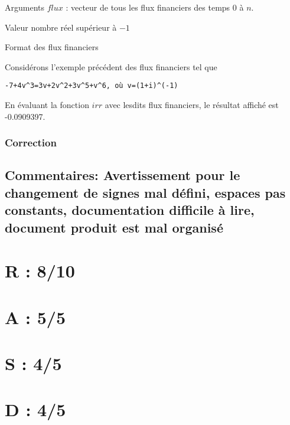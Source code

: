 \documentclass[]{article}
\begin{document}
Arguments \(flux\) : vecteur de tous les flux financiers des temps \(0\)
à \(n\).

Valeur nombre réel supérieur à \(-1\)

Format des flux financiers

Considérons l'exemple précédent des flux financiers tel que

\begin{verbatim}
-7+4v^3=3v+2v^2+3v^5+v^6, où v=(1+i)^(-1)
\end{verbatim}

En évaluant la fonction \(irr\) avec lesdits flux financiers, le
résultat affiché est -0.0909397.

\hypertarget{correction}{%
\subsubsection{Correction}\label{correction}}

\hypertarget{commentaires-avertissement-pour-le-changement-de-signes-mal-duxe9fini-espaces-pas-constants-documentation-difficile-uxe0-lire-document-produit-est-mal-organisuxe9}{%
\subsection{Commentaires: Avertissement pour le changement de signes mal
défini, espaces pas constants, documentation difficile à lire, document
produit est mal
organisé}\label{commentaires-avertissement-pour-le-changement-de-signes-mal-duxe9fini-espaces-pas-constants-documentation-difficile-uxe0-lire-document-produit-est-mal-organisuxe9}}

\hypertarget{r-810}{%
\section{R : 8/10}\label{r-810}}

\hypertarget{a-55}{%
\section{A : 5/5}\label{a-55}}

\hypertarget{s-45}{%
\section{S : 4/5}\label{s-45}}

\hypertarget{d-45}{%
\section{D : 4/5}\label{d-45}}
\end{document}
